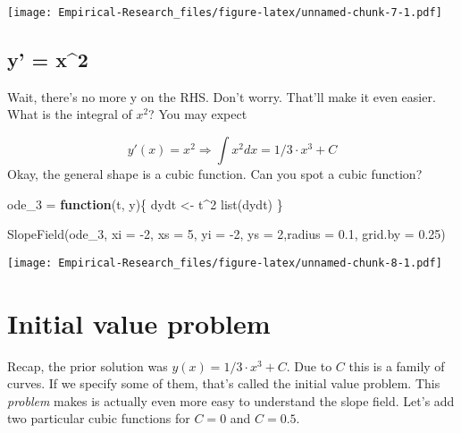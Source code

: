\documentclass[
]{book}
\newenvironment{Shaded}{\begin{snugshade}}{\end{snugshade}}
\newcommand{\AttributeTok}[1]{\textcolor[rgb]{0.77,0.63,0.00}{#1}}
\newcommand{\ControlFlowTok}[1]{\textcolor[rgb]{0.13,0.29,0.53}{\textbf{#1}}}
\newcommand{\DecValTok}[1]{\textcolor[rgb]{0.00,0.00,0.81}{#1}}
\newcommand{\FloatTok}[1]{\textcolor[rgb]{0.00,0.00,0.81}{#1}}
\newcommand{\FunctionTok}[1]{\textcolor[rgb]{0.00,0.00,0.00}{#1}}
\newcommand{\NormalTok}[1]{#1}
\newcommand{\OtherTok}[1]{\textcolor[rgb]{0.56,0.35,0.01}{#1}}
\newcommand{\SpecialCharTok}[1]{\textcolor[rgb]{0.00,0.00,0.00}{#1}}
\begin{document}
\texttt{[image: Empirical-Research\_files/figure-latex/unnamed-chunk-7-1.pdf]}

\hypertarget{y-x2}{%
\subsection{y' = x\^{}2}\label{y-x2}}

Wait, there's no more y on the RHS. Don't worry. That'll make it even easier. What is the integral of \(x^2\)? You may expect

\[y'(x) = x^2 \Rightarrow \int x^2 dx = 1/3 \cdot x^3 + C\]
Okay, the general shape is a cubic function. Can you spot a cubic function?

\begin{Shaded}
\begin{Highlighting}[]
\NormalTok{ode\_3 }\OtherTok{=} \ControlFlowTok{function}\NormalTok{(t, y)\{}
\NormalTok{  dydt }\OtherTok{\textless{}{-}}\NormalTok{ t}\SpecialCharTok{\^{}}\DecValTok{2}
  \FunctionTok{list}\NormalTok{(dydt)}
\NormalTok{\}}

\FunctionTok{SlopeField}\NormalTok{(ode\_3, }\AttributeTok{xi =} \SpecialCharTok{{-}}\DecValTok{2}\NormalTok{, }\AttributeTok{xs =} \DecValTok{5}\NormalTok{, }\AttributeTok{yi =} \SpecialCharTok{{-}}\DecValTok{2}\NormalTok{, }\AttributeTok{ys =} \DecValTok{2}\NormalTok{,}\AttributeTok{radius =} \FloatTok{0.1}\NormalTok{, }\AttributeTok{grid.by =} \FloatTok{0.25}\NormalTok{)}
\end{Highlighting}
\end{Shaded}

\texttt{[image: Empirical-Research\_files/figure-latex/unnamed-chunk-8-1.pdf]}

\hypertarget{initial-value-problem}{%
\section{Initial value problem}\label{initial-value-problem}}

Recap, the prior solution was \(y(x) = 1/3 \cdot x^3 + C\). Due to \(C\) this is a family of curves. If we specify some of them, that's called the initial value problem. This \emph{problem} makes is actually even more easy to understand the slope field. Let's add two particular cubic functions for \(C = 0\) and \(C = 0.5\).
\end{document}
